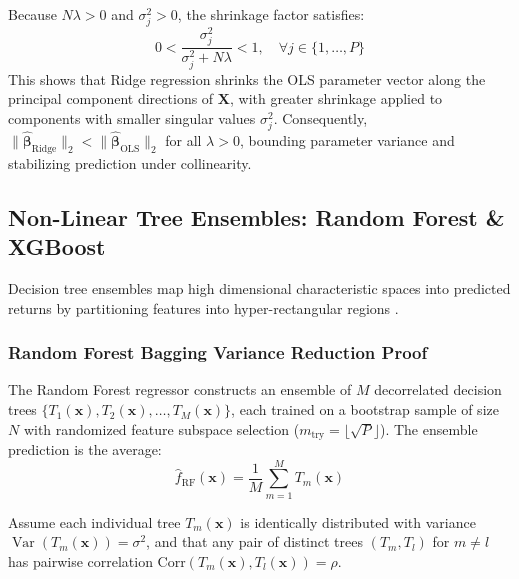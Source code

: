 Because $N \lambda > 0$ and $\sigma_j^2 > 0$, the shrinkage factor satisfies:
\begin{equation}
0 < \frac{\sigma_j^2}{\sigma_j^2 + N \lambda} < 1, \quad \forall j \in \{1, \dots, P\}
\end{equation}
This shows that Ridge regression shrinks the OLS parameter vector along the principal component directions of $\mathbf{X}$, with greater shrinkage applied to components with smaller singular values $\sigma_j^2$. Consequently, $\|\hat{\boldsymbol{\beta}}_{\text{Ridge}}\|_2 < \|\hat{\boldsymbol{\beta}}_{\text{OLS}}\|_2$ for all $\lambda > 0$, bounding parameter variance and stabilizing prediction under collinearity.

\subsection{Non-Linear Tree Ensembles: Random Forest \& XGBoost}
\label{subsec:ch4_tree_ensembles}

Decision tree ensembles map high dimensional characteristic spaces into predicted returns by partitioning features into hyper-rectangular regions \citep{gu2020empirical}.

\subsubsection{Random Forest Bagging Variance Reduction Proof}
The Random Forest regressor \citep{breiman2001random} constructs an ensemble of $M$ decorrelated decision trees $\{T_1(\mathbf{x}), T_2(\mathbf{x}), \dots, T_M(\mathbf{x})\}$, each trained on a bootstrap sample of size $N$ with randomized feature subspace selection ($m_{\text{try}} = \lfloor \sqrt{P} \rfloor$). The ensemble prediction is the average:
\begin{equation}
\hat{f}_{\text{RF}}(\mathbf{x}) = \frac{1}{M} \sum_{m=1}^M T_m(\mathbf{x})
\label{eq:ch4_rf_prediction}
\end{equation}

Assume each individual tree $T_m(\mathbf{x})$ is identically distributed with variance $\operatorname{Var}(T_m(\mathbf{x})) = \sigma^2$, and that any pair of distinct trees $(T_m, T_l)$ for $m \neq l$ has pairwise correlation $\text{Corr}(T_m(\mathbf{x}), T_l(\mathbf{x})) = \rho$.

